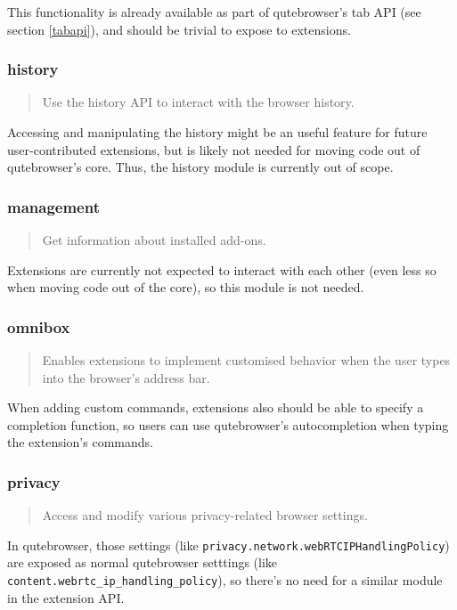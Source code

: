 \documentclass[a4paper,parskip=full]{scrreprt}
\begin{document}
This functionality is already available as part of qutebrowser's tab API (see
section \ref{tabapi}), and should be trivial to expose to extensions.

\subsubsection{history}
\begin{quote}
Use the history API to interact with the browser history.
\end{quote}

Accessing and manipulating the history might be an useful feature for future
user-contributed extensions, but is likely not needed for moving code out of
qutebrowser's core. Thus, the history module is currently out of scope.

\subsubsection{management}
\begin{quote}
Get information about installed add-ons.
\end{quote}

Extensions are currently not expected to interact with each other (even less so
when moving code out of the core), so this module is not needed.

\subsubsection{omnibox}
\begin{quote}
Enables extensions to implement customised behavior when the user types into the
browser's address bar.
\end{quote}

When adding custom commands, extensions also should be able to specify a
completion function, so users can use qutebrowser's autocompletion when typing
the extension's commands.

\subsubsection{privacy}
\begin{quote}
Access and modify various privacy-related browser settings.
\end{quote}

In qutebrowser, those settings (like
\verb|privacy.network.webRTCIPHandlingPolicy|) are exposed as normal qutebrowser
setttings (like \verb|content.webrtc_ip_handling_policy|), so there's no need
for a similar module in the extension API.
\end{document}
